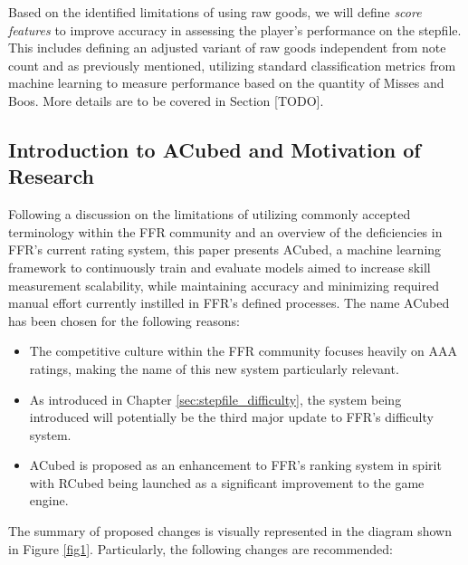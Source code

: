 \vspace{2mm}

Based on the identified limitations of using raw goods, we will define \textit{score features} to improve accuracy in assessing the player's performance on the stepfile. This includes defining an adjusted variant of raw goods independent from note count and as previously mentioned, utilizing standard classification metrics from machine learning to measure performance based on the quantity of Misses and Boos. More details are to be covered in Section [TODO].

\subsection{Introduction to ACubed and Motivation of Research}

Following a discussion on the limitations of utilizing commonly accepted terminology within the FFR community and an overview of the deficiencies in FFR's current rating system, this paper presents ACubed, a machine learning framework to continuously train and evaluate models aimed to increase skill measurement scalability, while maintaining accuracy and minimizing required manual effort currently instilled in FFR's defined processes. The name ACubed has been chosen for the following reasons:

\begin{itemize}
	\item The competitive culture within the FFR community focuses heavily on AAA ratings, making the name of this new system particularly relevant.
	\item As introduced in Chapter \ref{sec:stepfile_difficulty}, the system being introduced will potentially be the third major update to FFR's difficulty system.
	\item ACubed is proposed as an enhancement to FFR's ranking system in spirit with RCubed being launched as a significant improvement to the game engine.
\end{itemize}

The summary of proposed changes is visually represented in the diagram shown in Figure \ref{fig1}. Particularly, the following changes are recommended:


